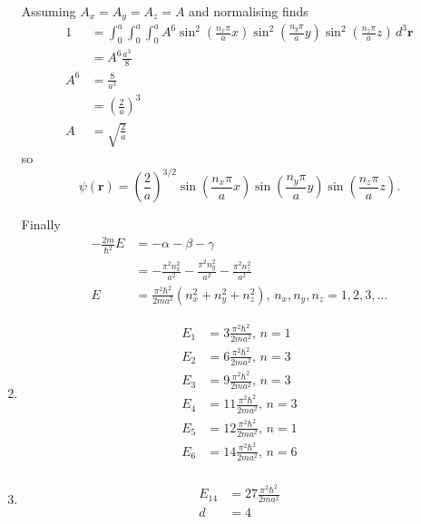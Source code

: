 \documentclass{article}
\renewcommand{\vec}[1]{\boldsymbol{\mathbf{#1}}}
\begin{document}
\begin{enumerate}
        Assuming $A_x = A_y = A_z = A$ and normalising finds \begin{align*}
          1   & = \int_0^a \int_0^a \int_0^a A^6 \sin^2 \left( \frac{n_x \pi}{a} x \right) \sin^2 \left( \frac{n_y \pi}{a} y \right) \sin^2 \left( \frac{n_z \pi}{a} z \right) \,d^3 \vec{r} \\
              & = A^6 \frac{a^3}{8}                                                                                                                                                          \\
          A^6 & = \frac{8}{a^3}                                                                                                                                                              \\
              & = \left( \frac{2}{a} \right)^3                                                                                                                                               \\
          A   & = \sqrt{\frac{2}{a}}
        \end{align*} so \[\psi(\vec{r}) = \left( \frac{2}{a} \right)^{3 / 2} \sin \left( \frac{n_x \pi}{a} x \right) \sin \left( \frac{n_y \pi}{a} y \right) \sin \left( \frac{n_z \pi}{a} z \right).\]

        Finally \begin{align*}
          -\frac{2 m}{\hbar^2} E & = -\alpha - \beta - \gamma                                                                 \\
                                 & = -\frac{\pi^2 n_x^2}{a^2} - \frac{\pi^2 n_y^2}{a^2} - \frac{\pi^2 n_z^2}{a^2}             \\
          E                      & = \frac{\pi^2 \hbar^2}{2 m a^2} (n_x^2 + n_y^2 + n_z^2), \,n_x, n_y, n_z = 1, 2, 3, \ldots
        \end{align*}

  \item

        \begin{align*}
          E_1 & = 3 \frac{\pi^2 \hbar^2}{2 m a^2}, \,n = 1  \\
          E_2 & = 6 \frac{\pi^2 \hbar^2}{2 m a^2}, \,n = 3  \\
          E_3 & = 9 \frac{\pi^2 \hbar^2}{2 m a^2}, \,n = 3  \\
          E_4 & = 11 \frac{\pi^2 \hbar^2}{2 m a^2}, \,n = 3 \\
          E_5 & = 12 \frac{\pi^2 \hbar^2}{2 m a^2}, \,n = 1 \\
          E_6 & = 14 \frac{\pi^2 \hbar^2}{2 m a^2}, \,n = 6 \\
        \end{align*}

  \item

        \begin{align*}
          E_{14} & = 27 \frac{\pi^2 \hbar^2}{2 m a^2} \\
          d      & = 4
        \end{align*}
\end{enumerate}
\end{document}

